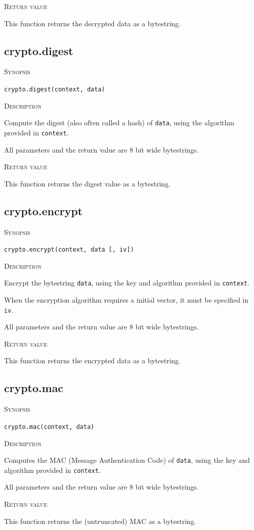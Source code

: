 \documentclass[11pt]{report}
\newcommand{\mansection}[1]{\vspace{0.5em}\par\noindent\textsc{#1}\vspace{0.5em}\par}
\newcommand{\syn}[1]{\texttt{#1}}
\begin{document}
\mansection{Return value}
This function returns the decrypted data as a bytestring.  

\subsection{crypto.digest}

\mansection{Synopsis}
\syn{crypto.digest(context, data)}

\mansection{Description}
Compute the digest (also often called a hash) of \syn{data}, using the algorithm provided in \syn{context}.

All parameters and the return value are 8 bit wide bytestrings.

\mansection{Return value}
This function returns the digest value as a bytestring.

\subsection{crypto.encrypt}

\mansection{Synopsis}
\syn{crypto.encrypt(context, data [, iv])}

\mansection{Description}
Encrypt the bytestring \syn{data}, using the key and algorithm provided in \syn{context}. 

When the encryption algorithm requires a initial vector, it must be specified in \syn{iv}.

All parameters and the return value are 8 bit wide bytestrings.

\mansection{Return value}
This function returns the encrypted data as a bytestring.

\subsection{crypto.mac}

\mansection{Synopsis}
\syn{crypto.mac(context, data)}

\mansection{Description}
Computes the MAC (Message Authentication Code) of \syn{data}, using the key and algorithm provided in \syn{context}.

All parameters and the return value are 8 bit wide bytestrings.

\mansection{Return value}
This function returns the (untruncated) MAC as a bytestring.


\end{document}
